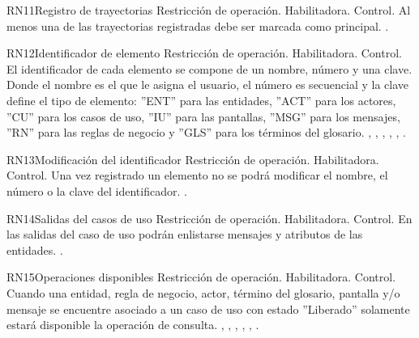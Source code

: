 	\begin{BussinesRule}{RN11}{Registro de trayectorias} 
		\BRitem[Tipo:] Restricción de operación. 
		\BRitem[Clase:] Habilitadora. 
		\BRitem[Nivel:] Control. %
		\BRitem[Descripción:] Al menos una de las trayectorias registradas debe ser marcada como principal.
		 \UCref{}{}. 
	\end{BussinesRule}

\begin{BussinesRule}{RN12}{Identificador de elemento} 
	\BRitem[Tipo:] Restricción de operación. 
	\BRitem[Clase:] Habilitadora. 
	\BRitem[Nivel:] Control. %
	\BRitem[Descripción:] El identificador de cada elemento se compone de un nombre, número y una clave. Donde el nombre es el que le asigna el usuario, el número es secuencial y la clave define el tipo de elemento: ''ENT'' para las entidades, ''ACT'' para los actores, ''CU'' para los casos de uso, ''IU'' para las pantallas, ''MSG'' para los mensajes, ''RN'' para las reglas de negocio y ''GLS'' para los términos del glosario.
	 , , , , , . 
\end{BussinesRule}

\begin{BussinesRule}{RN13}{Modificación del identificador} 
	\BRitem[Tipo:] Restricción de operación. 
	\BRitem[Clase:] Habilitadora. 
	\BRitem[Nivel:] Control. %
	\BRitem[Descripción:] Una vez registrado un elemento no se podrá modificar el nombre, el número o la clave del identificador.
	 \UCref{}{}. 
\end{BussinesRule}

\begin{BussinesRule}{RN14}{Salidas del casos de uso} 
	\BRitem[Tipo:] Restricción de operación. 
	\BRitem[Clase:] Habilitadora. 
	\BRitem[Nivel:] Control. %
	\BRitem[Descripción:] En las salidas del caso de uso podrán enlistarse mensajes y atributos de las entidades.
	 \UCref{}{}. 
\end{BussinesRule}

\begin{BussinesRule}{RN15}{Operaciones disponibles} 
	\BRitem[Tipo:] Restricción de operación. 
	\BRitem[Clase:] Habilitadora. 
	\BRitem[Nivel:] Control. %
	\BRitem[Descripción:] Cuando una entidad, regla de negocio, actor, término del glosario, pantalla y/o mensaje se encuentre asociado a un caso de uso con estado ''Liberado'' solamente estará disponible la operación de consulta.
	 , , , , , . 
\end{BussinesRule}

